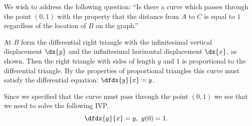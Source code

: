 We wish to address the following question:
``Is
there a curve which passes through the point $(0, 1)$ with the
property that  the distance from $A$ to $C$ is equal to $1$ regardless
of the location of $B$ on the graph.''

At $B$ form the differential right triangle with the infinitesimal
vertical displacement $\dx{y}$ and the infinitesimal horizontal
displacement $\dx{x}$, as shown. Then the right triangle with sides of
length $y$ and $1$ is proportional to the differential triangle. By
the properties of proportional triangles this curve must satisfy the
differential equation: $  \dfdx{y}{x} = y$.

Since we specified that the curve must pass through the point $(0, 1)$
we see that we need to solve the following IVP.
\begin{equation}
  \label{IVP:ExpDiffeq1}
  \dfdx{y}{x} = y,\  y(0)=1.
\end{equation}




